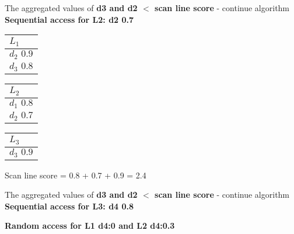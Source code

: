  The aggregated values of\textbf{ d3 and d2 $<$ scan line score} - continue algorithm
\\
\textbf{Sequential access for L2: d2 0.7}
 \begin{center}
    \begin{minipage}[t]{2cm}
        \begin{tabular}{|p{25pt}|}\hline
          $L_1$\\\hline
          $d_2 \, \, 0.9$\\\hline
          $d_3 \, \, 0.8$\\\hline
        \end{tabular}
    \end{minipage}
    \hspace{5mm}
    \begin{minipage}[t]{2cm}
        \begin{tabular}{|p{25pt}|}\hline
          $L_2$\\\hline
          $d_1 \, \, 0.8$\\\hline
          $d_2 \, \, 0.7$\\\hline
            \end{tabular}
    \end{minipage}
    \hspace{5mm}
    \begin{minipage}[t]{2cm}
        \begin{tabular}{|p{25pt}|}\hline
        $L_3$\\\hline
        $d_3 \, \, 0.9$\\\hline      
        \end{tabular}
    \end{minipage}
    \end{center}

Scan line score = 0.8 + 0.7 + 0.9 = 2.4

The aggregated values of\textbf{ d3 and d2 $<$ scan line score} - continue algorithm
\\
\textbf{Sequential access for L3: d4 0.8}

\textbf{Random access for L1 d4:0 and L2 d4:0.3}

